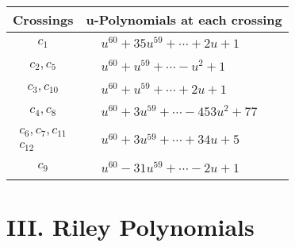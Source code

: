 \documentclass[1p]{elsarticle_modified}
\theoremstyle{definition}
\begin{document}
\begin{tabular}{m{50pt}|m{274pt}}
Crossings & \hspace{64pt}u-Polynomials at each crossing \\
\hline $$\begin{aligned}c_{1}\end{aligned}$$&$\begin{aligned}
&u^{60}+35 u^{59}+\cdots+2 u+1
\end{aligned}$\\
\hline $$\begin{aligned}c_{2},c_{5}\end{aligned}$$&$\begin{aligned}
&u^{60}+u^{59}+\cdots- u^2+1
\end{aligned}$\\
\hline $$\begin{aligned}c_{3},c_{10}\end{aligned}$$&$\begin{aligned}
&u^{60}+u^{59}+\cdots+2 u+1
\end{aligned}$\\
\hline $$\begin{aligned}c_{4},c_{8}\end{aligned}$$&$\begin{aligned}
&u^{60}+3 u^{59}+\cdots-453 u^2+77
\end{aligned}$\\
\hline $$\begin{aligned}c_{6},c_{7},c_{11}\\c_{12}\end{aligned}$$&$\begin{aligned}
&u^{60}+3 u^{59}+\cdots+34 u+5
\end{aligned}$\\
\hline $$\begin{aligned}c_{9}\end{aligned}$$&$\begin{aligned}
&u^{60}-31 u^{59}+\cdots-2 u+1
\end{aligned}$\\
\hline
\end{tabular}\newpage\renewcommand{\arraystretch}{1}
\centering \section*{ III. Riley Polynomials}
\end{document}

